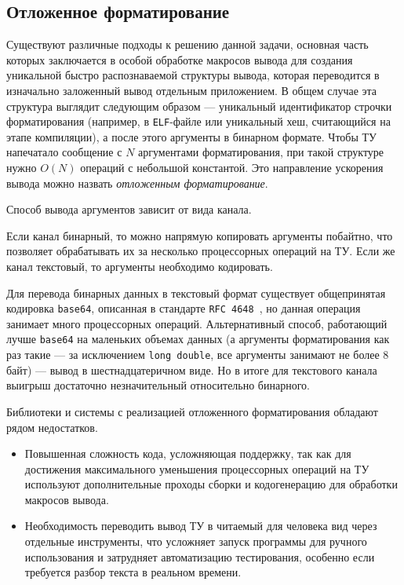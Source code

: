 \subsection{Отложенное форматирование}
\label{sec:deferred}

Существуют различные подходы к решению данной задачи, основная часть которых заключается в особой обработке макросов вывода для создания уникальной быстро распознаваемой структуры вывода, которая переводится в изначально заложенный вывод отдельным приложением.
В общем случае эта структура выглядит следующим образом --- уникальный идентификатор строчки форматирования (например, в \texttt{ELF}-файле или уникальный хеш, считающийся на этапе компиляции), а после этого аргументы в бинарном формате.
Чтобы ТУ напечатало сообщение с $N$ аргументами форматирования, при такой структуре нужно $O(N)$ операций с небольшой константой.
Это направление ускорения вывода можно назвать \textit{отложенным форматирование}.

Способ вывода аргументов зависит от вида канала.

Если канал бинарный, то можно напрямую копировать аргументы побайтно, что позволяет обрабатывать их за несколько процессорных операций на ТУ.
Если же канал текстовый, то аргументы необходимо кодировать.

Для перевода бинарных данных в текстовый формат существует общепринятая кодировка \texttt{base64}, описанная в стандарте \texttt{RFC 4648}~\cite{Rfc4648}, но данная операция занимает много процессорных операций.
Альтернативный способ, работающий лучше \texttt{base64} на маленьких объемах данных (а аргументы форматирования как раз такие --- за исключением \texttt{long double}, все аргументы занимают не более 8 байт) --- вывод в шестнадцатеричном виде.
Но в итоге для текстового канала выигрыш достаточно незначительный относительно бинарного.

Библиотеки и системы с реализацией отложенного форматирования обладают рядом недостатков.
\label{sec:deferred-drawbacks}
\begin{itemize}
    \item Повышенная сложность кода, усложняющая поддержку, так как для достижения максимального уменьшения процессорных операций на ТУ используют дополнительные проходы сборки и кодогенерацию для обработки макросов вывода.
    \item Необходимость переводить вывод ТУ в читаемый для человека вид через отдельные инструменты, что усложняет запуск программы для ручного использования и затрудняет автоматизацию тестирования, особенно если требуется разбор текста в реальном времени.
\end{itemize}

